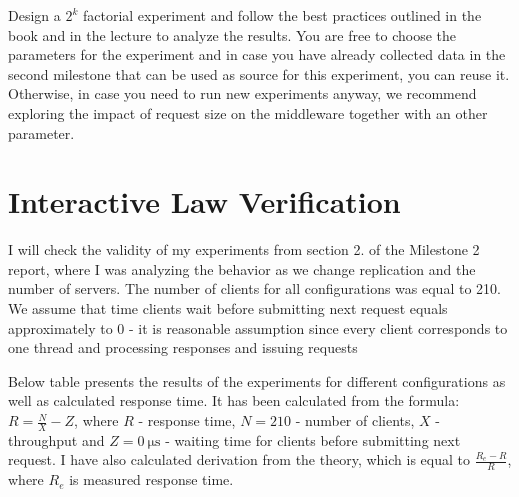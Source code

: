 \documentclass[11pt]{article}
\begin{document}
Design a $2^k$ factorial experiment and follow the best practices outlined in the book and in the lecture to analyze the results. You are free to choose the parameters for the experiment and in case you have already collected data in the second milestone that can be used as source for this experiment, you can reuse it. Otherwise, in case you need to run new experiments anyway, we recommend exploring the impact of request size on the middleware together with an other parameter.

\pagebreak

\section{Interactive Law Verification}\label{sec:interactive-law}

\iffalse
Length: 1-2 pages

Check the validity of all experiments from one of the three sections in your Milestone 2 report using the interactive law (choose a section in which your system has at least 9 different configurations). Analyze the results and explain them in detail.
\fi

I will check the validity of my experiments from section 2. of the Milestone 2 report, where I was analyzing the behavior as we change replication and the number of servers. The number of clients for all configurations was equal to 210. We assume that time clients wait before submitting next request equals approximately to 0 - it is reasonable assumption since every client corresponds to one thread and processing responses and issuing requests 

Below table presents the results of the experiments for different configurations as well as calculated response time. It has been calculated from the formula: $R = \frac{N}{X} - Z$, where $R$ - response time, $N = 210$ - number of clients, $X$ - throughput and $Z=\SI{0}{\micro\second}$ - waiting time for clients before submitting next request. I have also calculated derivation from the theory, which is equal to $\frac{R_e - R}{R}$, where $R_e$ is measured response time.
\medskip
\end{document}
